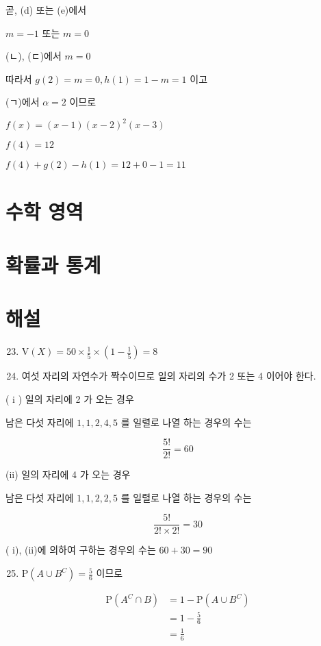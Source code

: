 \documentclass[10pt]{article}
\begin{document}
곧, (d) 또는 (e)에서

$m=-1$ 또는 $m=0$

(ㄴ), (ㄷ)에서 $m=0$

따라서 $g(2)=m=0, h(1)=1-m=1$ 이고

(ㄱ)에서 $\alpha=2$ 이므로

$f(x)=(x-1)(x-2)^{2}(x-3)$

$f(4)=12$

$f(4)+g(2)-h(1)=12+0-1=11$

\section*{수학 영역}
\section*{확률과 통계}
\section*{해설}
\begin{enumerate}
  \setcounter{enumi}{22}
  \item $\mathrm{V}(X)=50 \times \frac{1}{5} \times\left(1-\frac{1}{5}\right)=8$

  \item 여섯 자리의 자연수가 짝수이므로 일의 자리의 수가 2 또는 4 이어야 한다.

\end{enumerate}

( i ) 일의 자리에 2 가 오는 경우

남은 다섯 자리에 $1,1,2,4,5$ 를 일렬로 나열 하는 경우의 수는

\[
\frac{5!}{2!}=60
\]

(ii) 일의 자리에 4 가 오는 경우

남은 다섯 자리에 $1,1,2,2,5$ 를 일렬로 나열 하는 경우의 수는

\[
\frac{5!}{2!\times 2!}=30
\]

( i), (ii)에 의하여 구하는 경우의 수는 $60+30=90$

\begin{enumerate}
  \setcounter{enumi}{24}
  \item $\mathrm{P}\left(A \cup B^{C}\right)=\frac{5}{6}$ 이므로
\end{enumerate}

\[
\begin{aligned}
\mathrm{P}\left(A^{C} \cap B\right) & =1-\mathrm{P}\left(A \cup B^{C}\right) \\
& =1-\frac{5}{6} \\
& =\frac{1}{6}
\end{aligned}
\]
\end{document}
